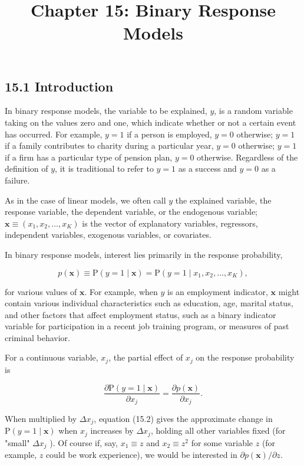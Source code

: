 \documentclass[10pt]{article}
\title{Chapter 15: Binary Response Models}
\author{}
\date{}
\begin{document}
\maketitle

\subsection*{15.1 Introduction}
In binary response models, the variable to be explained, $y$, is a random variable taking on the values zero and one, which indicate whether or not a certain event has occurred. For example, $y=1$ if a person is employed, $y=0$ otherwise; $y=1$ if a family contributes to charity during a particular year, $y=0$ otherwise; $y=1$ if a firm has a particular type of pension plan, $y=0$ otherwise. Regardless of the definition of $y$, it is traditional to refer to $y=1$ as a success and $y=0$ as a failure.

As in the case of linear models, we often call $y$ the explained variable, the response variable, the dependent variable, or the endogenous variable; $\mathbf{x} \equiv\left(x_{1}, x_{2}, \ldots, x_{K}\right)$ is the vector of explanatory variables, regressors, independent variables, exogenous variables, or covariates.

In binary response models, interest lies primarily in the response probability,


\begin{equation*}
p(\mathbf{x}) \equiv \mathrm{P}(y=1 \mid \mathbf{x})=\mathrm{P}\left(y=1 \mid x_{1}, x_{2}, \ldots, x_{K}\right), \tag{15.1}
\end{equation*}


for various values of $\mathbf{x}$. For example, when $y$ is an employment indicator, $\mathbf{x}$ might contain various individual characteristics such as education, age, marital status, and other factors that affect employment status, such as a binary indicator variable for participation in a recent job training program, or measures of past criminal behavior.

For a continuous variable, $x_{j}$, the partial effect of $x_{j}$ on the response probability is


\begin{equation*}
\frac{\partial \mathrm{P}(y=1 \mid \mathbf{x})}{\partial x_{j}}=\frac{\partial p(\mathbf{x})}{\partial x_{j}} . \tag{15.2}
\end{equation*}


When multiplied by $\Delta x_{j}$, equation (15.2) gives the approximate change in $\mathrm{P}(y=1 \mid \mathbf{x})$ when $x_{j}$ increases by $\Delta x_{j}$, holding all other variables fixed (for "small" $\Delta x_{j}$ ). Of course if, say, $x_{1} \equiv z$ and $x_{2} \equiv z^{2}$ for some variable $z$ (for example, $z$ could be work experience), we would be interested in $\partial p(\mathbf{x}) / \partial z$.
\end{document}
